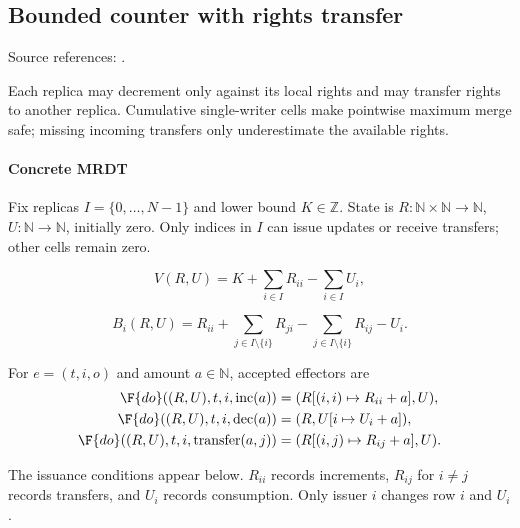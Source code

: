 \subsection{Bounded counter with rights transfer}
\label{app:dt-bounded-counter}

\noindent Source references: \cite{BalegasBoundedCounter}.






Each replica may decrement only against its local rights and may transfer rights to another replica. Cumulative single-writer cells make pointwise maximum merge safe; missing incoming transfers only underestimate the available rights.

\paragraph{Concrete MRDT}
Fix replicas $I=\{0,\ldots,N-1\}$ and lower bound $K\in\mathbb Z$. State is $R:\mathbb N\times\mathbb N\to\mathbb N$, $U:\mathbb N\to\mathbb N$, initially zero. Only indices in $I$ can issue updates or receive transfers; other cells remain zero.

\[
V(R,U)=K+\sum_{i\in I}R_{ii}-\sum_{i\in I}U_i,
\]

\[
B_i(R,U)=R_{ii}+\sum_{j\in I\setminus\{i\}}R_{ji}-\sum_{j\in I\setminus\{i\}}R_{ij}-U_i.
\]


For $e=(t,i,o)$ and amount $a\in\mathbb N$, accepted effectors are
\[
\begin{aligned}
\F{do}((R,U),t,i,\mathrm{inc}(a))&=(R[(i,i)\mapsto R_{ii}+a],U),\\
\F{do}((R,U),t,i,\mathrm{dec}(a))&=(R,U[i\mapsto U_i+a]),\\
\F{do}((R,U),t,i,\mathrm{transfer}(a,j))&=(R[(i,j)\mapsto R_{ij}+a],U).
\end{aligned}
\]

The issuance conditions appear below. $R_{ii}$ records increments, $R_{ij}$ for $i\ne j$ records transfers, and $U_i$ records consumption. Only issuer $i$ changes row $i$ and $U_i$.

